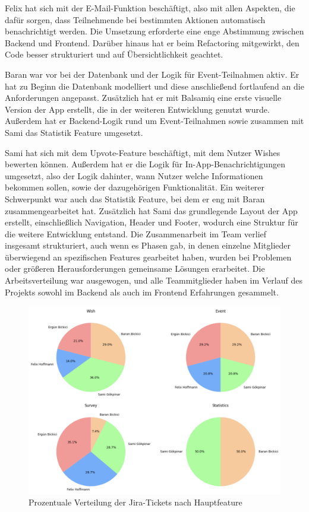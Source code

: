 \documentclass[a4paper,12pt]{article}
\begin{document}
Felix hat sich mit der E-Mail-Funktion beschäftigt, also mit allen Aspekten, die dafür sorgen, dass Teilnehmende bei bestimmten Aktionen automatisch benachrichtigt werden. Die Umsetzung erforderte eine enge Abstimmung zwischen Backend und Frontend. Darüber hinaus hat er beim \gls{Refactoring} mitgewirkt, den Code besser strukturiert und auf Übersichtlichkeit geachtet. 

Baran war vor bei der Datenbank und der Logik für Event-Teilnahmen aktiv. Er hat zu Beginn die Datenbank modelliert und diese anschließend fortlaufend an die Anforderungen angepasst. Zusätzlich hat er mit \gls{Balsamiq} eine erste visuelle Version der App erstellt, die in der weiteren Entwicklung genutzt wurde. Außerdem hat er Backend-Logik rund um Event-Teilnahmen sowie zusammen mit Sami das Statistik Feature umgesetzt.

Sami hat sich mit dem \gls{Upvote-Feature} beschäftigt, mit dem Nutzer Wishes bewerten können. Außerdem hat er die Logik für \gls{In-App-Benachrichtigungen} umgesetzt, also der Logik dahinter, wann Nutzer welche Informationen bekommen sollen, sowie der dazugehörigen Funktionalität. Ein weiterer Schwerpunkt war auch das Statistik Feature, bei dem er eng mit Baran zusammengearbeitet hat. Zusätzlich hat Sami das grundlegende Layout der App erstellt, einschließlich Navigation, Header und Footer, wodurch eine Struktur für die weitere Entwicklung entstand. Die Zusammenarbeit im Team verlief insgesamt strukturiert, auch wenn es Phasen gab, in denen einzelne Mitglieder überwiegend an spezifischen Features gearbeitet haben, wurden bei Problemen oder größeren Herausforderungen gemeinsame Lösungen erarbeitet. Die Arbeitsverteilung war ausgewogen, und alle Teammitglieder haben im Verlauf des Projekts sowohl im Backend als auch im Frontend Erfahrungen gesammelt.

\begin{figure}[H]
    \centering
    \includegraphics[width=1\textwidth]{Abbildungen/aufgaben_verteilung.png}
    \caption{Prozentuale Verteilung der Jira-Tickets nach Hauptfeature}
    \label{fig:aufgaben_verteilung}
\end{figure}
\end{document}
